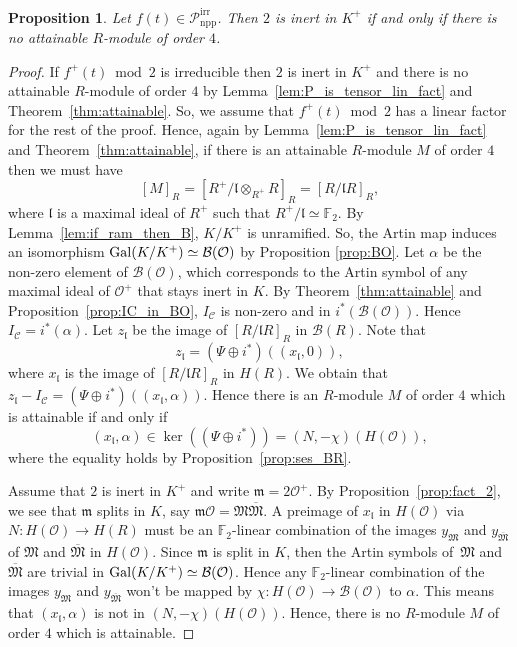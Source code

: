\documentclass[11pt]{amsart}
\newcommand\F{\mathbb{F}}
\def\Gal{\mathop{\rm Gal}\nolimits}
\newcommand\cB{\mathcal{B}}
\newcommand\cC{\mathcal{C}}
\newcommand\cO{\mathcal{O}}
\newcommand\frl{\mathfrak{l}}
\newcommand\frm{\mathfrak{m}}
\newcommand\frM{\mathfrak{M}}
\theoremstyle{plain}
\newtheorem{proposition}[theorem]{Proposition}
\theoremstyle{definition}
\newcommand\PirrA{\mathcal{P}^\mathrm{irr}_\mathrm{npp}}
\begin{document}
\begin{proposition}\label{prop:A_general}
    Let $f(t)\in\PirrA$.
    Then $2$ is inert in $K^+$ if and only if there is no attainable $R$-module of order $4$.
\end{proposition}
\begin{proof}
    If $f^+(t) \bmod 2$ is irreducible then $2$ is inert in $K^+$ and there is no attainable $R$-module of order $4$ by Lemma~\ref{lem:P_is_tensor_lin_fact} and Theorem~\ref{thm:attainable}.
    So, we assume that $f^+(t)\bmod 2$ has a linear factor for the rest of the proof.
    Hence, again by Lemma~\ref{lem:P_is_tensor_lin_fact} and Theorem~\ref{thm:attainable}, if there is an attainable $R$-module $M$ of order $4$ then we must have
    \[ [M]_R=[R^+/\frl\otimes_{R^+}R]_R=[R/\frl R]_R, \]
    where $\frl$ is a maximal ideal of $R^+$ such that $R^+/\frl\simeq \F_2$. 
    By Lemma~\ref{lem:if_ram_then_B}, $K/K^+$ is unramified.
    So, the Artin map induces an isomorphism $\Gal(K/K^+)\simeq \cB(\cO)$ by Proposition \ref{prop:BO}.
    Let $\alpha$ be the non-zero element of $\cB(\cO)$, which corresponds to the Artin symbol of any maximal ideal of $\cO^+$ that stays inert in $K$.
    By Theorem~\ref{thm:attainable} and Proposition~\ref{prop:IC_in_BO}, $I_\cC$ is non-zero and in $i^*(\cB(\cO))$.
    Hence $I_\cC = i^*(\alpha)$.
    Let $z_\frl$ be the image of $[R/\frl R]_R$ in $\cB(R)$.
    Note that 
    \[ z_\frl = (\Psi \oplus i^*)((x_\frl,0)), \]
    where $x_\frl$ is the image of $[R/\frl R]_R$ in $H(R)$.
    We obtain that $z_\frl - I_\cC = (\Psi \oplus i^*)((x_\frl,\alpha))$.
    Hence there is an $R$-module $M$ of order $4$ which is attainable if and only if 
    \[ (x_\frl,\alpha) \in \ker((\Psi \oplus i^*)) = (N,-\chi)(H(\cO)), \] 
    where the equality holds by Proposition~\ref{prop:ses_BR}.

    Assume that $2$ is inert in $K^+$ and write $\frm=2\cO^+$.
    By Proposition~\ref{prop:fact_2}, we see that $\frm$ splits in $K$, say $\frm\cO = \frM\overline{\frM}$.
    A preimage of $x_\frl$ in $H(\cO)$ via $N:H(\cO)\to H(R)$ must be an $\F_2$-linear combination of the images $y_\frM$ and $y_{\overline{\frM}}$ of $\frM$ and $\overline{\frM}$ in $H(\cO)$.
    Since $\frm$ is split in $K$, then the Artin symbols of~$\frM$ and $\overline{\frM}$ are trivial in $\Gal(K/K^+)\simeq\cB(\cO)$.
    Hence any $\F_2$-linear combination of the images $y_\frM$ and $y_{\overline{\frM}}$ won't be mapped by $\chi:H(\cO)\to \cB(\cO)$ to $\alpha$.
    This means that $(x_\frl,\alpha)$ is not in $(N,-\chi)(H(\cO))$.
    Hence, there is no $R$-module $M$ of order $4$ which is attainable.


\end{proof}
\end{document}

